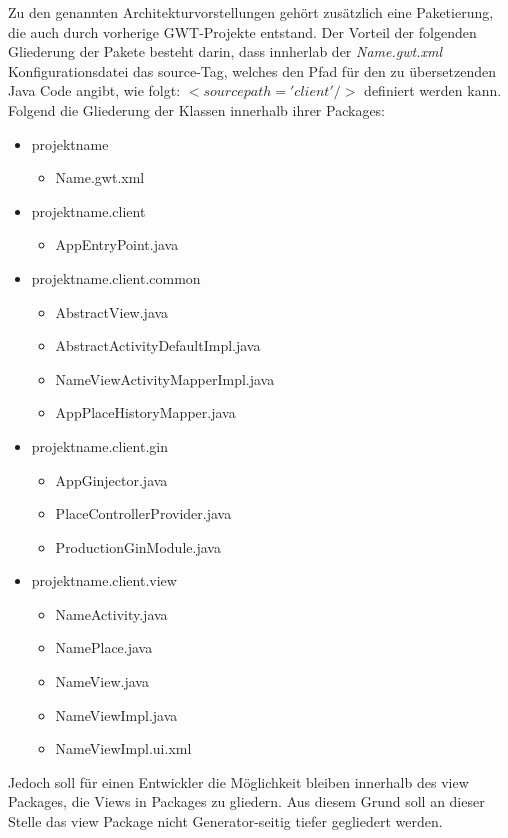 Zu den genannten Architekturvorstellungen gehört zusätzlich eine Paketierung,
die auch durch vorherige GWT-Projekte entstand. Der Vorteil der folgenden
Gliederung der Pakete besteht darin, dass innherlab der
\textit{\grqq{}Name\grqq{}.gwt.xml} Konfigurationsdatei das source-Tag, welches
den Pfad für den zu übersetzenden Java Code angibt, wie folgt: $<source
path='client'/>$ definiert werden kann. Folgend die Gliederung der Klassen
innerhalb ihrer Packages:
\begin{itemize}
  \item \grqq{}projektname\grqq{}
  	\begin{itemize}
    	\item \grqq{}Name\grqq{}.gwt.xml
  	\end{itemize}
  \item \grqq{}projektname\grqq{}.client
    \begin{itemize}
    	\item AppEntryPoint.java
    \end{itemize}
  \item \grqq{}projektname\grqq{}.client.common
    \begin{itemize}
      	\item AbstractView.java
  	  	\item AbstractActivityDefaultImpl.java
    	\item \grqq{}Name\grqq{}ViewActivityMapperImpl.java
    	\item AppPlaceHistoryMapper.java
    \end{itemize}
  \item \grqq{}projektname\grqq{}.client.gin
    \begin{itemize}
   		\item AppGinjector.java
    	\item PlaceControllerProvider.java
    	\item ProductionGinModule.java
    \end{itemize}

  \item \grqq{}projektname\grqq{}.client.view
    \begin{itemize}
    	\item \grqq{}Name\grqq{}Activity.java
    	\item \grqq{}Name\grqq{}Place.java
    	\item \grqq{}Name\grqq{}View.java
    	\item \grqq{}Name\grqq{}ViewImpl.java
    	\item \grqq{}Name\grqq{}ViewImpl.ui.xml
	\end{itemize}
\end{itemize}
Jedoch soll für einen Entwickler die Möglichkeit bleiben innerhalb des view
Packages, die Views in Packages zu gliedern. Aus diesem Grund soll an dieser
Stelle das view Package nicht Generator-seitig tiefer gegliedert werden.

